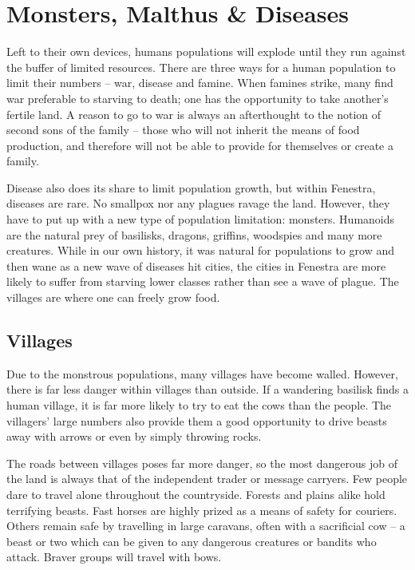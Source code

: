 
\section{Monsters, Malthus \& Diseases}

\begin{multicols}{2}

Left to their own devices, humans populations will explode until they run against the buffer of limited resources.  There are three ways for a human population to limit their numbers -- war, disease and famine.  When famines strike, many find war preferable to starving to death; one has the opportunity to take another's fertile land.  A reason to go to war is always an afterthought to the notion of second sons of the family -- those who will not inherit the means of food production, and therefore will not be able to provide for themselves or create a family.

Disease also does its share to limit population growth, but within Fenestra, diseases are rare.  No smallpox nor any plagues ravage the land.  However, they have to put up with a new type of population limitation: monsters.  Humanoids are the natural prey of basilisks, dragons, griffins, woodspies and many more creatures.  While in our own history, it was natural for populations to grow and then wane as a new wave of diseases hit cities, the cities in Fenestra are more likely to suffer from starving lower classes rather than see a wave of plague.  The villages are where one can freely grow food.

\subsection{Villages}

Due to the monstrous populations, many villages have become walled.  However, there is far less danger within villages than outside.  If a wandering basilisk finds a human village, it is far more likely to try to eat the cows than the people.  The villagers' large numbers also provide them a good opportunity to drive beasts away with arrows or even by simply throwing rocks.

The roads between villages poses far more danger, so the most dangerous job of the land is always that of the independent trader or message carryers.  Few people dare to travel alone throughout the countryside.
Forests and plains alike hold terrifying beasts.  Fast horses are highly prized as a means of safety for couriers.  Others remain safe by travelling in large caravans, often with a sacrificial cow -- a beast or two which can be given to any dangerous creatures or bandits who attack.  Braver groups will travel with bows.


\end{multicols}
